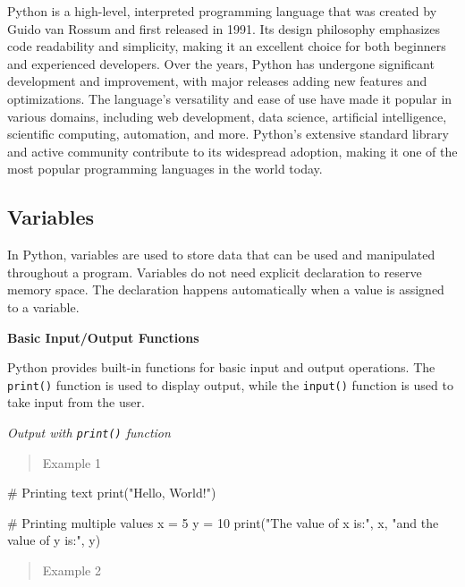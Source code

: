 \documentclass[
  letterpaper,
  DIV=11,
  numbers=noendperiod]{scrreprt}
\newenvironment{Shaded}{\begin{snugshade}}{\end{snugshade}}
\newcommand{\BuiltInTok}[1]{\textcolor[rgb]{0.00,0.23,0.31}{#1}}
\newcommand{\CommentTok}[1]{\textcolor[rgb]{0.37,0.37,0.37}{#1}}
\newcommand{\DecValTok}[1]{\textcolor[rgb]{0.68,0.00,0.00}{#1}}
\newcommand{\NormalTok}[1]{\textcolor[rgb]{0.00,0.23,0.31}{#1}}
\newcommand{\OperatorTok}[1]{\textcolor[rgb]{0.37,0.37,0.37}{#1}}
\newcommand{\StringTok}[1]{\textcolor[rgb]{0.13,0.47,0.30}{#1}}
\theoremstyle{plain}
\theoremstyle{definition}
\theoremstyle{remark}
\begin{document}
Python is a high-level, interpreted programming language that was
created by Guido van Rossum and first released in 1991. Its design
philosophy emphasizes code readability and simplicity, making it an
excellent choice for both beginners and experienced developers. Over the
years, Python has undergone significant development and improvement,
with major releases adding new features and optimizations. The
language's versatility and ease of use have made it popular in various
domains, including web development, data science, artificial
intelligence, scientific computing, automation, and more. Python's
extensive standard library and active community contribute to its
widespread adoption, making it one of the most popular programming
languages in the world today.

\subsection{Variables}\label{variables}

In Python, variables are used to store data that can be used and
manipulated throughout a program. Variables do not need explicit
declaration to reserve memory space. The declaration happens
automatically when a value is assigned to a variable.

\textbf{Basic Input/Output Functions}

Python provides built-in functions for basic input and output
operations. The \texttt{print()} function is used to display output,
while the \texttt{input()} function is used to take input from the user.

\emph{Output with \texttt{print()} function}

\begin{quote}
Example 1
\end{quote}

\begin{Shaded}
\begin{Highlighting}[]
\CommentTok{\# Printing text}
\BuiltInTok{print}\NormalTok{(}\StringTok{"Hello, World!"}\NormalTok{)}

\CommentTok{\# Printing multiple values}
\NormalTok{x }\OperatorTok{=} \DecValTok{5}
\NormalTok{y }\OperatorTok{=} \DecValTok{10}
\BuiltInTok{print}\NormalTok{(}\StringTok{"The value of x is:"}\NormalTok{, x, }\StringTok{"and the value of y is:"}\NormalTok{, y)}
\end{Highlighting}
\end{Shaded}

\begin{quote}
Example 2
\end{quote}
\end{document}
